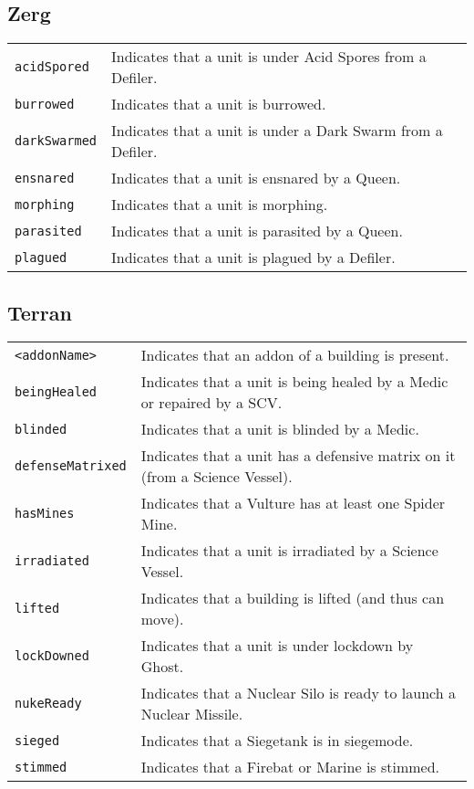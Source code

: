 \subsection{Zerg}
\begin{tabularx}{\textwidth}{lX}
 \verb|acidSpored | & Indicates that a unit is under Acid Spores from a Defiler. \\
 \verb|burrowed| & Indicates that a unit is burrowed. \\
 \verb|darkSwarmed| & Indicates that a unit is under a Dark Swarm from a Defiler. \\
 \verb|ensnared| & Indicates that a unit is ensnared by a Queen. \\
 \verb|morphing| & Indicates that a unit is morphing. \\
 \verb|parasited| & Indicates that a unit is parasited by a Queen. \\
 \verb|plagued| & Indicates that a unit is plagued by a Defiler.
\end{tabularx}

\subsection{Terran}
\begin{tabularx}{\textwidth}{lX}
 \verb|<addonName>| & Indicates that an addon of a building is present. \\
 \verb|beingHealed| & Indicates that a unit is being healed by a Medic or repaired by a SCV. \\
 \verb|blinded| & Indicates that a unit is blinded by a Medic. \\
 \verb|defenseMatrixed| & Indicates that a unit has a defensive matrix on it (from a Science Vessel).\\
 \verb|hasMines| & Indicates that a Vulture has at least one Spider Mine. \\
 \verb|irradiated| & Indicates that a unit is irradiated by a Science Vessel. \\
 \verb|lifted| & Indicates that a building is lifted (and thus can move). \\
 \verb|lockDowned| & Indicates that a unit is under lockdown by Ghost. \\
 \verb|nukeReady| & Indicates that a Nuclear Silo is ready to launch a Nuclear Missile. \\
 \verb|sieged| & Indicates that a Siegetank is in siegemode. \\
 \verb|stimmed| & Indicates that a Firebat or Marine is stimmed.
\end{tabularx}

